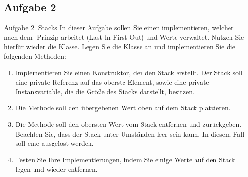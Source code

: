 \subsection{Aufgabe 2}
{\taskenum
\begin{frame}[c]{Aufgabe 2: Stacks}
    In dieser Aufgabe sollen Sie einen  implementieren, welcher nach dem -Prinzip arbeitet (Last In First Out) und  Werte verwaltet. Nutzen Sie hierfür wieder die  Klasse. Legen Sie die Klasse  an und implementieren Sie die folgenden Methoden:
    \begin{enumerate}
        \item<3-> Implementieren Sie einen Konstruktor, der den Stack erstellt. Der Stack soll eine private Referenz auf das oberste Element, sowie eine private Instanzvariable, die die Größe des Stacks darstellt, besitzen.
        \item<4-> Die Methode  soll den übergebenen Wert oben auf dem Stack platzieren.
        \item<5-> Die Methode  soll den obersten Wert vom Stack entfernen und zurückgeben. Beachten Sie, dass der Stack unter Umständen leer sein kann. In diesem Fall soll eine  ausgelöst werden.
        \item<6-> Testen Sie Ihre Implementierungen, indem Sie einige Werte auf den Stack legen und wieder entfernen.
    \end{enumerate}
\endtaskblock
\end{frame}

}
